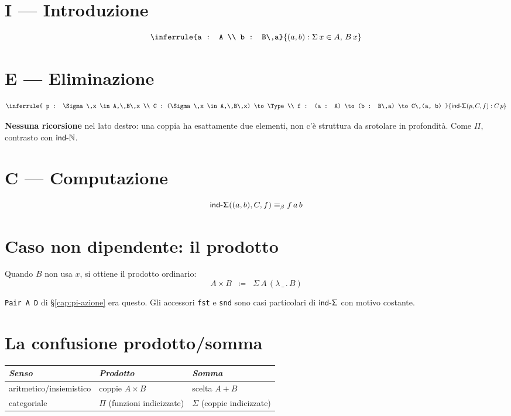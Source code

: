 \section*{I --- Introduzione}
\[
\inferrule{a : A \\ b : B\,a}{(a, b) : \Sigma\,x \in A,\,B\,x}
\]

\section*{E --- Eliminazione}
\[
\inferrule{
p : \Sigma\,x \in A,\,B\,x \\
C : (\Sigma\,x \in A,\,B\,x) \to \Type \\
f : (a : A) \to (b : B\,a) \to C\,(a, b)
}{
\indS(p, C, f) : C\,p
}
\]

\textbf{Nessuna ricorsione} nel lato destro: una coppia ha esattamente due elementi, non c'\`e struttura da srotolare in profondit\`a. Come $\Pi$, contrasto con $\mathsf{ind\text{-}\mathbb{N}}$.

\section*{C --- Computazione}
\[
\mathsf{ind\text{-}\Sigma}((a, b), C, f) \equiv_{\beta} f\,a\,b
\]

\section*{Caso non dipendente: il prodotto}

Quando $B$ non usa $x$, si ottiene il prodotto ordinario:
\[
A \times B \;\;\coloneqq\;\; \Sigma\,A\,(\lambda\,\_\,.\,B)
\]

\texttt{Pair A D} di \S\ref{cap:pi-azione} era questo. Gli accessori \texttt{fst} e \texttt{snd} sono casi particolari di $\mathsf{ind\text{-}\Sigma}$ con motivo costante.

\section*{La confusione prodotto/somma}

\begin{center}
\renewcommand{\arraystretch}{1.15}
\begin{tabular}{lll}
\toprule
\textit{Senso} & \textit{Prodotto} & \textit{Somma} \\
\midrule
aritmetico/insiemistico & coppie $A \times B$ & scelta $A + B$ \\
categoriale             & $\Pi$ (funzioni indicizzate) & $\Sigma$ (coppie indicizzate) \\
\bottomrule
\end{tabular}
\end{center}

